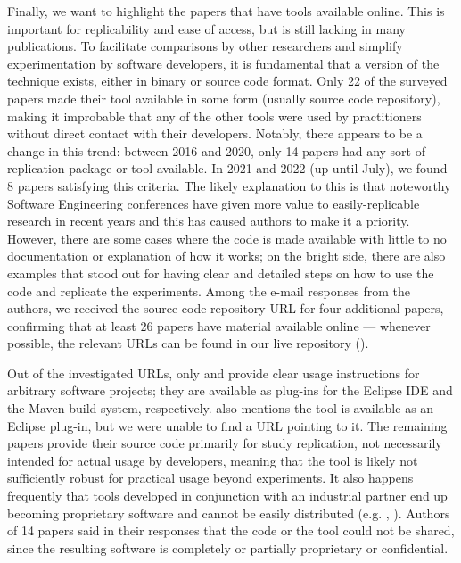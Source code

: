 Finally, we want to highlight the papers that have tools available online.
This is important for replicability and ease of access, but is still lacking in many publications.
To facilitate comparisons by other researchers and simplify experimentation by software developers, it is fundamental that a version of the technique exists, either in binary or source code format.
Only 22 of the surveyed papers made their tool available in some form (usually source code repository), making it improbable that any of the other tools were used by practitioners without direct contact with their developers.
Notably, there appears to be a change in this trend: between 2016 and 2020, only 14 papers had any sort of replication package or tool available.
In 2021 and 2022 (up until July), we found 8 papers satisfying this criteria.
The likely explanation to this is that noteworthy Software Engineering conferences have given more value to easily-replicable research in recent years and this has caused authors to make it a priority.
However, there are some cases where the code is made available with little to no documentation or explanation of how it works; on the bright side, there are also examples that stood out for having clear and detailed steps on how to use the code and replicate the experiments.
Among the e-mail responses from the authors, we received the source code repository URL for four additional papers, confirming that at least 26 papers have material available online --- whenever possible, the relevant URLs can be found in our live repository ().

Out of the investigated URLs, only  and  provide clear usage instructions for arbitrary software projects; they are available as plug-ins for the Eclipse IDE and the Maven build system, respectively.
 also mentions the tool is available as an Eclipse plug-in, but we were unable to find a URL pointing to it.
The remaining papers provide their source code primarily for study replication, not necessarily intended for actual usage by developers, meaning that the tool is likely not sufficiently robust for practical usage beyond experiments.
It also happens frequently that tools developed in conjunction with an industrial partner end up becoming proprietary software and cannot be easily distributed (e.g. , ).
Authors of 14 papers said in their responses that the code or the tool could not be shared, since the resulting software is completely or partially proprietary or confidential.

